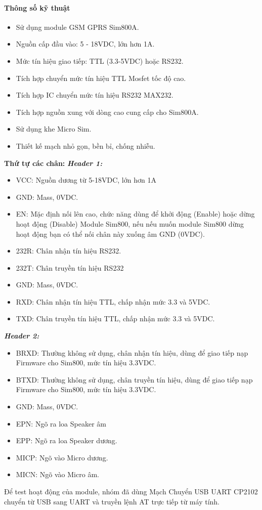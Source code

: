 \paragraph{Thông số kỹ thuật}
\begin{itemize}
\item Sử dụng module GSM GPRS Sim800A.
\item Nguồn cấp đầu vào: 5 - 18VDC, lớn hơn 1A.
\item Mức tín hiệu giao tiếp: TTL (3.3-5VDC) hoặc RS232.
\item Tích hợp chuyển mức tín hiệu TTL Mosfet tốc độ cao.
\item Tích hợp IC chuyển mức tín hiệu RS232 MAX232.
\item Tích hợp nguồn xung với dòng cao cung cấp cho Sim800A.
\item Sử dụng khe Micro Sim.
\item Thiết kế mạch nhỏ gọn, bền bỉ, chống nhiễu.
\end{itemize}
\textbf{Thứ tự các chân:}
\textit{\textbf{Header 1: }}
\begin{itemize}
\item VCC: Nguồn dương từ 5-18VDC, lớn hơn 1A
\item GND: Mass, 0VDC.
\item EN: Mặc định nối lên cao, chức năng dùng để khởi động (Enable) hoặc dừng hoạt động (Disable) Module Sim800, nếu nếu muốn module Sim800 dừng hoạt động bạn có thể nối chân này xuống âm GND (0VDC).
\item 232R: Chân nhận tín hiệu RS232.
\item 232T: Chân truyền tín hiệu RS232
\item GND: Mass, 0VDC.
\item RXD: Chân nhận tín hiệu TTL, chấp nhận mức 3.3 và 5VDC.
\item TXD: Chân truyền tín hiệu TTL, chấp nhận mức 3.3 và 5VDC.
\end{itemize}
\textit{\textbf{Header 2: }}
\begin{itemize}
\item BRXD: Thường không sử dụng, chân nhận tín hiệu, dùng để giao tiếp nạp Firmware cho Sim800, mức tín hiệu 3.3VDC.
\item BTXD: Thường không sử dụng, chân truyền tín hiệu, dùng để giao tiếp nạp Firmware cho Sim800, mức tín hiệu 3.3VDC.
\item GND: Mass, 0VDC.
\item EPN: Ngõ ra loa Speaker âm
\item EPP: Ngõ ra loa Speaker dương.
\item MICP: Ngõ vào Micro dương.
\item MICN: Ngõ vào Micro âm.
\end{itemize}
Để test hoạt động của module, nhóm đã dùng Mạch Chuyển USB UART CP2102 chuyển từ USB sang UART và truyền lệnh AT trực tiếp từ máy tính.
